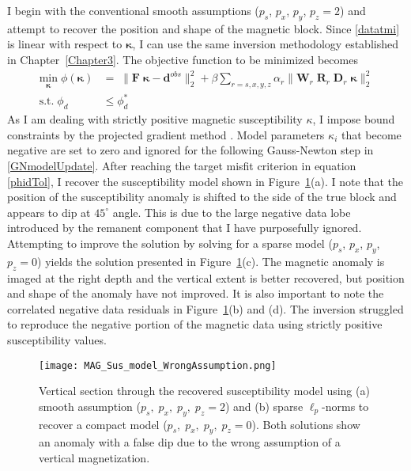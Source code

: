 I begin with the conventional smooth assumptions ($p_s$, $p_x$, $p_y$, $p_z = 2$) and attempt to recover the position and shape of the magnetic block.
Since \eqref{datatmi} is linear with respect to $\boldsymbol{\kappa}$, I can use the same inversion methodology established in Chapter~\ref{Chapter3}. The objective function to be minimized becomes
\begin{equation}\label{ObjFun3D_kappa}
\begin{split}
\underset{\boldsymbol{\kappa}}{\text{min}}\; \phi(\boldsymbol{\kappa}) & = \; \|\mathbf{F}\;\boldsymbol{\kappa} - \mathbf{d}^{obs}\|_2^2 + \beta \sum_{r=s,x,y,z} \alpha_r \|\mathbf{W}_r \;\mathbf{R}_r\;\mathbf{D}_r \;\boldsymbol{\kappa}\|_2^2 \\
\text{s.t.} \; \phi_d & \leq \phi_d^* \;
\end{split}
\end{equation}
As I am dealing with strictly positive magnetic susceptibility $\kappa$, I impose bound constraints by the projected gradient method \cite[]{Vogel02}. Model parameters $\kappa_i$ that become negative are set to zero and ignored for the following Gauss-Newton step in \eqref{GNmodelUpdate}.
After reaching the target misfit criterion in equation \eqref{phidTol}, I recover the susceptibility model shown in Figure~\ref{Susc_model}(a). I note that the position of the susceptibility anomaly is shifted to the side of the true block and appears to dip at $45^\circ$ angle. This is due to the large negative data lobe introduced by the remanent component that I have purposefully ignored. Attempting to improve the solution by solving for a sparse model ($p_s$, $p_x$, $p_y$, $p_z = 0$) yields the solution presented in Figure~\ref{Susc_model}(c). The magnetic anomaly is imaged at the right depth and the vertical extent is better recovered, but position and shape of the anomaly have not improved. It is also important to note the correlated negative data residuals in Figure~\ref{Susc_model}(b) and (d). The inversion struggled to reproduce the negative portion of the magnetic data using strictly positive susceptibility values.
\begin{figure}[h!]
\texttt{[image: MAG\_Sus\_model\_WrongAssumption.png]}
\caption{Vertical section through the recovered susceptibility model using (a) smooth assumption ($p_s, \;p_x,\; p_y,\; p_z = 2$) and (b) sparse $\ell_p$-norms to recover a compact model ($p_s,\;p_x,\; p_y,\; p_z = 0$). Both solutions show an anomaly with a false dip due to the wrong assumption of a vertical magnetization.}
\label{Susc_model}
\end{figure}

